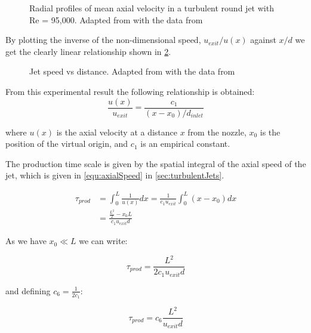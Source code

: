 \begin{figure}[H]
\begin{centering}
\caption{Radial profiles of mean axial velocity in a turbulent round jet with Re = 95,000. Adapted from \cite{pope2000} with the data from \cite{hussein1994}}
\label{fig:radialProfile}
\end{centering}
\end{figure}


\noindent By plotting the inverse of the non-dimensional speed, $u_{exit}/u(x)$ against $x/d$ we get the clearly linear relationship shown in \cref{fig:jetSpeed}.

\begin{figure}[H]
\begin{centering}
\caption{Jet speed vs distance. Adapted from \cite{pope2000} with the data from \cite{hussein1994}}
\label{fig:jetSpeed}
\end{centering}
\end{figure}

\noindent From this experimental result the following relationship is obtained: 
\begin{equation}
\label{equ:axialSpeed}
\frac{u(x)}{u_{exit}} = \frac{c_1}{\left(x-x_0\right)/d_{inlet}}
\end{equation}

\noindent where $u(x)$ is the axial velocity at a distance $x$ from the nozzle, $x_0$ is the position of the virtual origin, and $c_1$ is an empirical constant.


The production time scale is given by the spatial integral of the axial speed of the jet, which is given in \cref{equ:axialSpeed} in \cref{sec:turbulentJets}.

\begin{equation}
\begin{aligned}
\tau_{prod} &= \int_{0}^{L} \frac{1}{u(x)} dx = \frac{1}{c_1 u_{exit}} \int_0^L \left( x - x_0 \right) dx \\[2ex]
 &= \frac{\frac{L^2}{2} - x_0L}{c_1u_{exit}d}
\end{aligned}
\end{equation}

\noindent As we have $x_0\ll L$ we can write:

\begin{equation}
\tau_{prod} = \frac{L^2}{2c_1u_{exit}d}
\end{equation}

\noindent and defining $c_6 = \frac{1}{2c_1}$:

\begin{equation}
\tau_{prod} = c_6 \frac{L^2}{u_{exit} d}
\end{equation}

